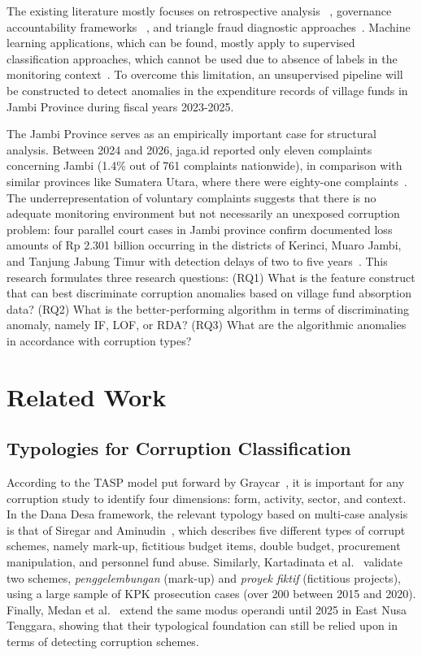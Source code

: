 \documentclass[3p,times,procedia]{elsarticle}
\begin{document}
The existing literature mostly focuses on retrospective analysis ~\cite{ref10}, governance accountability frameworks ~\cite{ref11}, and triangle fraud diagnostic approaches~\cite{ref12}. Machine learning applications, which can be found, mostly apply to supervised classification approaches, which cannot be used due to absence of labels in the monitoring context~\cite{ref13,ref14}. To overcome this limitation, an unsupervised pipeline will be constructed to detect anomalies in the expenditure records of village funds in Jambi Province during fiscal years 2023-2025.

The Jambi Province serves as an empirically important case for structural analysis. Between 2024 and 2026, jaga.id reported only eleven complaints concerning Jambi (1.4\% out of 761 complaints nationwide), in comparison with similar provinces like Sumatera Utara, where there were eighty-one complaints~\cite{ref9}. The underrepresentation of voluntary complaints suggests that there is no adequate monitoring environment but not necessarily an unexposed corruption problem: four parallel court cases in Jambi province confirm documented loss amounts of Rp 2.301 billion occurring in the districts of Kerinci, Muaro Jambi, and Tanjung Jabung Timur with detection delays of two to five years~\cite{ref15,ref16,ref17,ref18}. This research formulates three research questions: (RQ1) What is the feature construct that can best discriminate corruption anomalies based on village fund absorption data? (RQ2) What is the better-performing algorithm in terms of discriminating anomaly, namely IF, LOF, or RDA? (RQ3) What are the algorithmic anomalies in accordance with corruption types?

\section{Related Work}
\label{sec:related}

\subsection{Typologies for Corruption Classification}

According to the TASP model put forward by Graycar~\cite{ref19}, it is important for any corruption study to identify four dimensions: form, activity, sector, and context. In the Dana Desa framework, the relevant typology based on multi-case analysis is that of Siregar and Aminudin~\cite{ref13}, which describes five different types of corrupt schemes, namely mark-up, fictitious budget items, double budget, procurement manipulation, and personnel fund abuse. Similarly, Kartadinata et al.~\cite{ref14} validate two schemes, \textit{penggelembungan} (mark-up) and \textit{proyek fiktif} (fictitious projects), using a large sample of KPK prosecution cases (over 200 between 2015 and 2020). Finally, Medan et al.~\cite{ref20} extend the same modus operandi until 2025 in East Nusa Tenggara, showing that their typological foundation can still be relied upon in terms of detecting corruption schemes.
\end{document}
